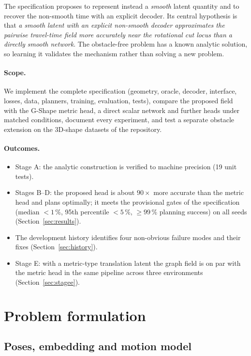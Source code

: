 \documentclass[11pt]{article}
\newcommand{\pct}{\,\%}
\begin{document}
The specification proposes to represent instead a \emph{smooth} latent quantity and to recover the
non-smooth time with an explicit decoder. Its central hypothesis is that \emph{a smooth latent with an
explicit non-smooth decoder approximates the pairwise travel-time field more accurately near the
rotational cut locus than a directly smooth network}. The obstacle-free problem has a known analytic
solution, so learning it validates the mechanism rather than solving a new problem.

\paragraph{Scope.} We implement the complete specification (geometry, oracle, decoder, interface,
losses, data, planners, training, evaluation, tests), compare the proposed field with the G-Shape
metric head, a direct scalar network and further heads under matched conditions, document every
experiment, and test a separate obstacle extension on the 3D-shape datasets of the repository.

\paragraph{Outcomes.}
\begin{itemize}
\item Stage A: the analytic construction is verified to machine precision (19 unit tests).
\item Stages B--D: the proposed head is about $90\times$ more accurate than the metric head and plans
optimally; it meets the provisional gates of the specification (median $<1\pct$, 95th percentile
$<5\pct$, $\ge 99\pct$ planning success) on all seeds (Section~\ref{sec:results}).
\item The development history identifies four non-obvious failure modes and their fixes
(Section~\ref{sec:history}).
\item Stage E: with a metric-type translation latent the graph field is on par with the metric head in
the same pipeline across three environments (Section~\ref{sec:stagee}).
\end{itemize}

\section{Problem formulation}
\label{sec:formulation}

\subsection{Poses, embedding and motion model}
\end{document}

